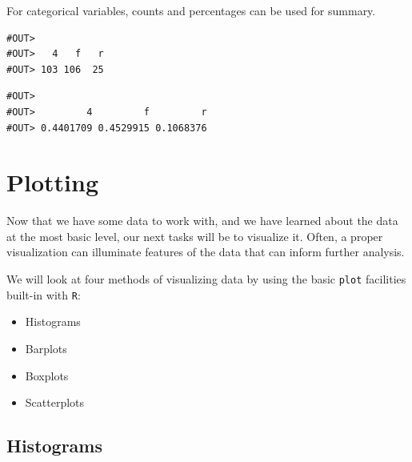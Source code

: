 \documentclass[]{book}
\newenvironment{Shaded}{\begin{snugshade}}{\end{snugshade}}
\newcommand{\KeywordTok}[1]{\textcolor[rgb]{0.13,0.29,0.53}{\textbf{#1}}}
\newcommand{\StringTok}[1]{\textcolor[rgb]{0.31,0.60,0.02}{#1}}
\newcommand{\OperatorTok}[1]{\textcolor[rgb]{0.81,0.36,0.00}{\textbf{#1}}}
\newcommand{\NormalTok}[1]{#1}
\providecommand{\tightlist}{%
  \setlength{\itemsep}{0pt}\setlength{\parskip}{0pt}}
\theoremstyle{definition}
\theoremstyle{definition}
\theoremstyle{definition}
\theoremstyle{remark}
\begin{document}
For categorical variables, counts and percentages can be used for
summary.

\begin{Shaded}
\end{Shaded}

\begin{verbatim}
#OUT> 
#OUT>   4   f   r 
#OUT> 103 106  25
\end{verbatim}

\begin{Shaded}
\end{Shaded}

\begin{verbatim}
#OUT> 
#OUT>         4         f         r 
#OUT> 0.4401709 0.4529915 0.1068376
\end{verbatim}

\section{Plotting}\label{plotting}

Now that we have some data to work with, and we have learned about the
data at the most basic level, our next tasks will be to visualize it.
Often, a proper visualization can illuminate features of the data that
can inform further analysis.

We will look at four methods of visualizing data by using the basic
\texttt{plot} facilities built-in with \texttt{R}:

\begin{itemize}
\tightlist
\item
  Histograms
\item
  Barplots
\item
  Boxplots
\item
  Scatterplots
\end{itemize}

\subsection{Histograms}\label{histograms}
\end{document}

